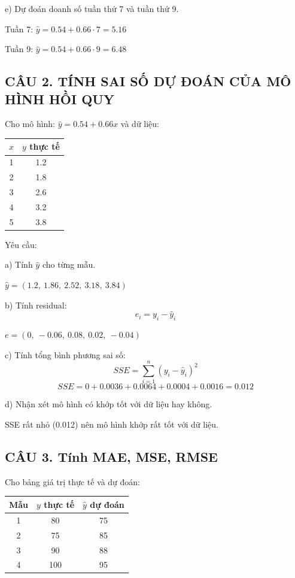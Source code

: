 \documentclass[a4paper,12pt]{article}
\begin{document}
e) Dự đoán doanh số tuần thứ 7 và tuần thứ 9.

Tuần 7: $\hat{y} = 0.54 + 0.66 \cdot 7 = 5.16$

Tuần 9: $\hat{y} = 0.54 + 0.66 \cdot 9 = 6.48$

\subsection*{CÂU 2. TÍNH SAI SỐ DỰ ĐOÁN CỦA MÔ HÌNH HỒI QUY}

Cho mô hình: $\hat{y} = 0.54 + 0.66x$ và dữ liệu:
\begin{center}
\begin{tabular}{|c|c|}
\hline
$x$ & $y$ thực tế \\
\hline
1 & 1.2 \\
2 & 1.8 \\
3 & 2.6 \\
4 & 3.2 \\
5 & 3.8 \\
\hline
\end{tabular}
\end{center}

Yêu cầu:

a) Tính $\hat{y}$ cho từng mẫu.

$\hat{y} = (1.2,\ 1.86,\ 2.52,\ 3.18,\ 3.84)$

b) Tính residual:
\[ e_i = y_i - \hat{y}_i \]

$e = (0,\ -0.06,\ 0.08,\ 0.02,\ -0.04)$

c) Tính tổng bình phương sai số:
\[ SSE = \sum_{i=1}^{n}(y_i - \hat{y}_i)^2 \]
\[ SSE = 0 + 0.0036 + 0.0064 + 0.0004 + 0.0016 = 0.012 \]

d) Nhận xét mô hình có khớp tốt với dữ liệu hay không.

SSE rất nhỏ (0.012) nên mô hình khớp rất tốt với dữ liệu.

\subsection*{CÂU 3. Tính MAE, MSE, RMSE}

Cho bảng giá trị thực tế và dự đoán:
\begin{center}
\begin{tabular}{|c|c|c|}
\hline
Mẫu & $y$ thực tế & $\hat{y}$ dự đoán \\
\hline
1 & 80 & 75 \\
2 & 75 & 85 \\
3 & 90 & 88 \\
4 & 100 & 95 \\
\hline
\end{tabular}
\end{center}
\end{document}
